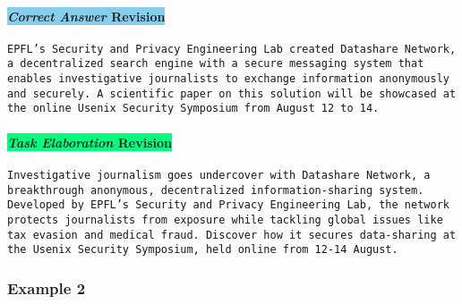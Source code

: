 \paragraph{\colorbox{SkyBlue}{\textit{Correct Answer} Revision}}
\texttt{EPFL's Security and Privacy Engineering Lab created Datashare Network, a decentralized search engine with a secure messaging system that enables investigative journalists to exchange information anonymously and securely. A scientific paper on this solution will be showcased at the online Usenix Security Symposium from August 12 to 14.}

\paragraph{\colorbox{SpringGreen}{\textit{Task Elaboration} Revision}}
\texttt{Investigative journalism goes undercover with Datashare Network, a breakthrough anonymous, decentralized information-sharing system. Developed by EPFL's Security and Privacy Engineering Lab, the network protects journalists from exposure while tackling global issues like tax evasion and medical fraud. Discover how it secures data-sharing at the Usenix Security Symposium, held online from 12-14 August.}



\subsubsection{Example 2}
